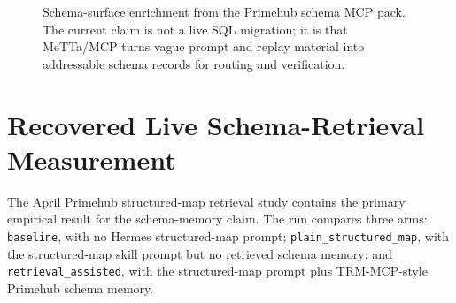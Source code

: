 \documentclass[11pt]{article}
\begin{document}
\begin{figure}[t]
\centering
{}
\caption{Schema-surface enrichment from the Primehub schema MCP pack. The current claim is not a live SQL migration; it is that MeTTa/MCP turns vague prompt and replay material into addressable schema records for routing and verification.}
\label{fig:schema}
\end{figure}

\section{Recovered Live Schema-Retrieval Measurement}

The April Primehub structured-map retrieval study contains the primary empirical result for the schema-memory claim. The run compares three arms: \texttt{baseline}, with no Hermes structured-map prompt; \texttt{plain\_structured\_map}, with the structured-map skill prompt but no retrieved schema memory; and \texttt{retrieval\_assisted}, with the structured-map prompt plus TRM-MCP-style Primehub schema memory.
\end{document}
